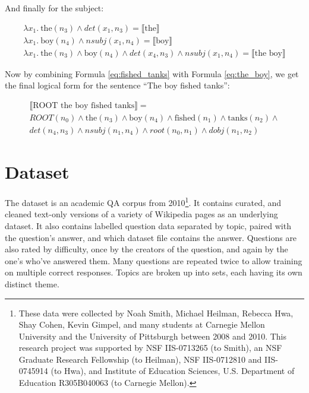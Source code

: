 \documentclass[twoside]{article}
\begin{document}
And finally for the subject:

\begin{eqnarray}
\lambda x_1.\ \text{the}(n_3) \wedge det(x_1, n_3) = \llbracket \text{the} \rrbracket \\
\lambda x_1.\ \text{boy}(n_4) \wedge nsubj(x_1, n_4) = \llbracket \text{boy} \rrbracket \\
{ \lambda x_1.\ \text{the}(n_3) \wedge \text{boy}(n_4) \wedge det(x_4, n_3) \wedge nsubj(x_1, n_4) = \llbracket \text{the boy} \rrbracket \label{eq:the_boy}  }
\end{eqnarray}

Now by combining Formula \ref{eq:fished_tanks} with Formula \ref{eq:the_boy}, we get the final logical form for the sentence ``The boy fished tanks'':

\begin{equation}
\begin{split}
\llbracket \text{ROOT the boy fished tanks} \rrbracket = \\
ROOT(n_0) \wedge \text{the}(n_3) \wedge \text{boy}(n_4) \wedge \text{fished}(n_1) \wedge \text{tanks}(n_2) \wedge \\
det(n_4, n_3) \wedge nsubj(n_1, n_4) \wedge root(n_0, n_1) \wedge dobj(n_1, n_2)
\end{split}
\end{equation}


\section{Dataset}
The dataset is an academic QA corpus from 2010\footnote{These data were collected by Noah Smith, Michael Heilman, Rebecca Hwa, Shay Cohen, Kevin Gimpel, and many students at Carnegie Mellon University and the University of Pittsburgh between 2008 and 2010. This research project was supported by NSF IIS-0713265 (to Smith), an NSF Graduate Research Fellowship (to Heilman), NSF IIS-0712810 and IIS-0745914 (to Hwa), and Institute of Education Sciences, U.S. Department of Education R305B040063 (to Carnegie Mellon).}.  It contains curated, and cleaned text-only versions of a variety of Wikipedia pages as an underlying dataset.  It also contains labelled question data separated by topic, paired with the question's answer, and which dataset file contains the answer.  Questions are also rated by difficulty, once by the creators of the question, and again by the one's who've answered them.  Many questions are repeated twice to allow training on multiple correct responses.  Topics are broken up into sets, each having its own distinct theme.
\end{document}
